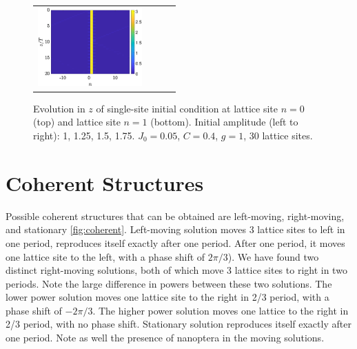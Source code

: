 \documentclass{article}
\begin{document}
\begin{figure}[H]
\begin{tabular}{cccc}
    \includegraphics[width=4cm]{right175}
    \end{tabular}
    \caption{Evolution in $z$ of single-site initial condition at lattice site $n=0$ (top) and lattice site $n=1$ (bottom). Initial amplitude (left to right): 1, 1.25, 1.5, 1.75. $J_0 = 0.05$, $C=0.4$, $g=1$, 30 lattice sites. }
    \label{fig:evolmoving}
\end{figure}

\section{Coherent Structures}

Possible coherent structures that can be obtained are left-moving, right-moving, and stationary \cref{fig:coherent}. Left-moving solution moves 3 lattice sites to left in one period, reproduces itself exactly after one period. After one period, it moves one lattice site to the left, with a phase shift of $2\pi/3$). We have found two distinct right-moving solutions, both of which move 3 lattice sites to right in two periods. Note the large difference in powers between these two solutions. The lower power solution moves one lattice site to the right in 2/3 period, with a phase shift of $-2\pi/3$. The higher power solution moves one lattice to the right in 2/3 period, with no phase shift. Stationary solution reproduces itself exactly after one period. Note as well the presence of nanoptera in the moving solutions.
\end{document}
